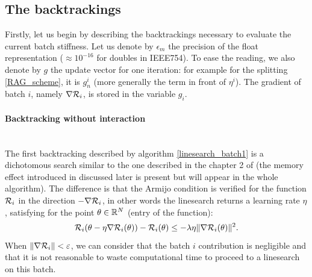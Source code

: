 \subsection{The backtrackings}
Firstly, let us begin by describing the backtrackings necessary to evaluate the current batch stiffness. Let us denote by $\epsilon_m$ the precision of the float representation
($\approx 10^{-16}$ for doubles in IEEE754). To ease the reading, we also denote by $g$ the update vector for one iteration: for example for the splitting \eqref{RAG_scheme}, it is $g_n^i$ (more generally the term in front of $\eta^i$). The gradient of batch $i$, namely $\nabla \mathcal{R}_i$, is stored in the variable $g_i$. 

\paragraph{Backtracking without interaction}
~~\\
The first backtracking described by algorithm \ref{linesearch_batch1} is a dichotomous search similar to the one described in the chapter 2 of \cite{Bilel_thesis} (the memory effect introduced in \cite{Rondepierre,Lyap_Theory_Bilel} discussed later is present but will appear in the whole algorithm). The difference is that the Armijo condition is verified for the function $\mathcal{R}_i$ in the direction $-\nabla \mathcal{R}_i$, in other words the linesearch returns a learning rate $\eta$, satisfying for the point $\theta \in \mathbb{R}^N$ (entry of the function):
\begin{equation}
	\mathcal{R}_i(\theta-\eta\nabla \mathcal{R}_i(\theta))-\mathcal{R}_i(\theta) \leq -\lambda \eta \|\nabla \mathcal{R}_i(\theta)\|^2.
	\label{armijo_batch1}
\end{equation}
When $\|\nabla \mathcal{R}_i\|<\varepsilon$, we can consider that the batch $i$ contribution is negligible and that it is not reasonable to waste computational time to proceed to a linesearch on this batch. 

